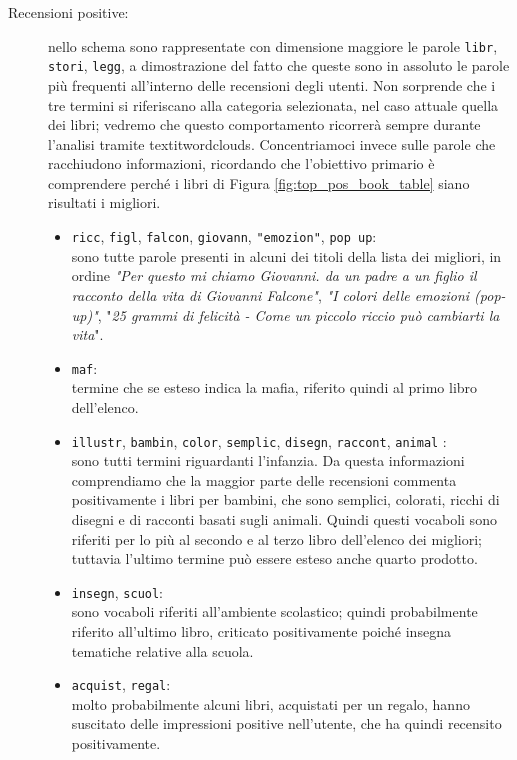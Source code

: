 			\begin{description}
				\item[Recensioni positive:]
				 nello schema sono rappresentate con dimensione maggiore le parole \verb|libr|, \verb|stori|, \verb|legg|, a dimostrazione del fatto che queste sono in assoluto le parole più frequenti all'interno delle recensioni degli utenti. Non sorprende che i tre termini si riferiscano alla categoria selezionata, nel caso attuale quella dei libri; vedremo che questo comportamento ricorrerà sempre durante l'analisi tramite textit{wordclouds}. Concentriamoci invece sulle parole che racchiudono informazioni, ricordando che l'obiettivo primario è comprendere perché i libri di Figura \ref{fig:top_pos_book_table} siano risultati i migliori.
				\begin{itemize}
					\item \texttt{ricc}, \texttt{figl}, \texttt{falcon},  \texttt{giovann}, \texttt{"emozion"}, \texttt{pop up}: \\
					sono tutte parole presenti in alcuni dei titoli della lista dei migliori, in ordine \textit{"Per questo mi chiamo Giovanni. da un padre a un figlio il racconto della vita di Giovanni Falcone"}, \textit{"I colori delle emozioni (pop-up)"}, "\textit{25 grammi di felicità - Come un piccolo riccio può cambiarti la vita}". 
					\item \texttt{maf}: \\
					termine che se esteso indica la mafia, riferito quindi al primo libro dell'elenco.
					\item \texttt{illustr}, \texttt{bambin}, \texttt{color}, \texttt{semplic},  \texttt{disegn}, \texttt{raccont}, \texttt{animal} : \\
					sono tutti termini riguardanti l'infanzia. Da questa informazioni comprendiamo che la maggior parte delle recensioni commenta positivamente i libri per bambini, che sono semplici, colorati, ricchi di disegni e di racconti basati sugli animali. Quindi questi vocaboli sono riferiti per lo più al secondo e al terzo libro dell'elenco dei migliori; tuttavia l'ultimo termine può essere esteso anche quarto prodotto. 
					\item \texttt{insegn}, \texttt{scuol}: \\
					sono vocaboli riferiti all'ambiente scolastico; quindi probabilmente riferito all'ultimo libro, criticato positivamente poiché insegna tematiche relative alla scuola.
					\item \texttt{acquist}, \texttt{regal}: \\
					molto probabilmente alcuni libri, acquistati per un regalo, hanno suscitato delle impressioni positive nell'utente, che ha quindi recensito positivamente.
				\end{itemize}	
			

\end{description}
